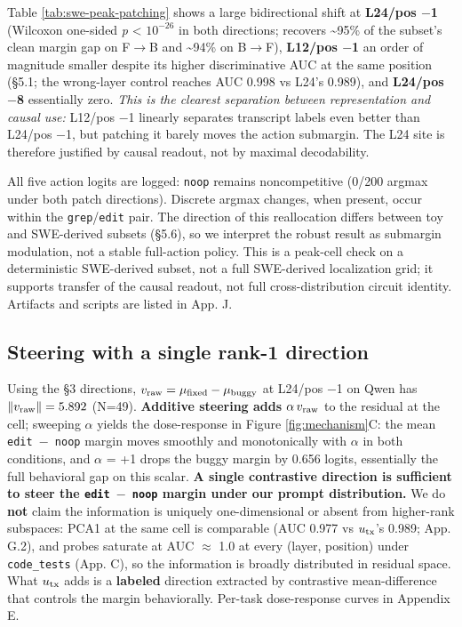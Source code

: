 \documentclass[
  11pt,
  a4paper]{article}
\begin{document}
Table \ref{tab:swe-peak-patching} shows a large bidirectional shift at
\textbf{L24/pos \ensuremath{-}1} (Wilcoxon one-sided \emph{p} \textless{}
\(10^{-26}\) in both directions; recovers \textasciitilde95\% of the
subset's clean margin gap on F\ensuremath{\rightarrow}B and \textasciitilde94\% on B\ensuremath{\rightarrow}F),
\textbf{L12/pos \ensuremath{-}1} an order of magnitude smaller despite its higher
discriminative AUC at the same position (\S{}5.1; the wrong-layer control
reaches AUC 0.998 vs L24's 0.989), and \textbf{L24/pos \ensuremath{-}8} essentially
zero. \emph{This is the clearest separation between representation and
causal use:} L12/pos \ensuremath{-}1 linearly separates transcript labels even better
than L24/pos \ensuremath{-}1, but patching it barely moves the action submargin. The
L24 site is therefore justified by causal readout, not by maximal
decodability.

All five action logits are logged: \texttt{noop} remains noncompetitive
(0/200 argmax under both patch directions). Discrete argmax changes,
when present, occur within the \texttt{grep}/\texttt{edit} pair. The
direction of this reallocation differs between toy and SWE-derived
subsets (\S{}5.6), so we interpret the robust result as submargin
modulation, not a stable full-action policy. This is a peak-cell check
on a deterministic SWE-derived subset, not a full SWE-derived
localization grid; it supports transfer of the causal readout, not full
cross-distribution circuit identity. Artifacts and scripts are listed in
App. J.

\subsection{Steering with a single rank-1
direction}\label{steering-with-a-single-rank-1-direction}

Using the \S{}3 directions, \(v_{\rm raw}=\mu_{\rm fixed}-\mu_{\rm buggy}\)
at L24/pos \ensuremath{-}1 on Qwen has \(\|v_{\rm raw}\| = 5.892\) (N=49).
\textbf{Additive steering adds \(\alpha\,v_{\rm raw}\)} to the residual
at the cell; sweeping \ensuremath{\alpha} yields the dose-response in Figure
\ref{fig:mechanism}C: the mean \texttt{edit\ \ensuremath{-}\ noop} margin moves
smoothly and monotonically with \ensuremath{\alpha} in both conditions, and \ensuremath{\alpha} = +1 drops
the buggy margin by 0.656 logits, essentially the full behavioral gap on
this scalar. \textbf{A single contrastive direction is sufficient to
steer the \texttt{edit\ \ensuremath{-}\ noop} margin under our prompt distribution.}
We do \textbf{not} claim the information is uniquely one-dimensional or
absent from higher-rank subspaces: PCA1 at the same cell is comparable
(AUC 0.977 vs \(u_{\rm tx}\)'s 0.989; App. G.2), and probes saturate at
AUC \ensuremath{\approx} 1.0 at every (layer, position) under \texttt{code\_tests} (App.
C), so the information is broadly distributed in residual space. What
\(u_{\rm tx}\) adds is a \textbf{labeled} direction extracted by
contrastive mean-difference that controls the margin behaviorally.
Per-task dose-response curves in Appendix E.
\end{document}
